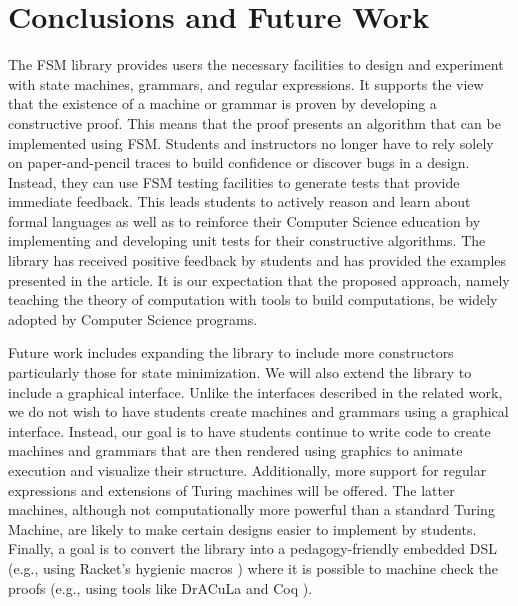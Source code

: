 \documentclass{eptcs}
\begin{document}
\section{Conclusions and Future Work}
The \textsf{FSM} library provides users the necessary facilities to design and experiment with state machines, grammars, and regular expressions. It supports the view that the existence of a machine or grammar is proven by developing a constructive proof. This means that the proof presents an algorithm that can be implemented using \textsf{FSM}. Students and instructors no longer have to rely solely on paper-and-pencil traces to build confidence or discover bugs in a design. Instead, they can use \textsf{FSM} testing facilities to generate tests that provide immediate feedback. This leads students to actively reason and learn about formal languages as well as to reinforce their Computer Science education by implementing and developing unit tests for their constructive algorithms. The library has received positive feedback by students and has provided the examples presented in the article. It is our expectation that the proposed approach, namely teaching the theory of computation with tools to build computations, be widely adopted by Computer Science programs.

Future work includes expanding the library to include more constructors particularly those for state minimization. We will also extend the library to include a graphical interface. Unlike the interfaces described in the related work, we do not wish to have students create machines and grammars using a graphical interface. Instead, our goal is to have students continue to write code to create machines and grammars that are then rendered using graphics to animate execution and visualize their structure. Additionally, more support for regular expressions and extensions of Turing machines will be offered. The latter machines, although not computationally more powerful than a standard Turing Machine, are likely to make certain designs easier to implement by students. Finally, a goal is to convert the library into a pedagogy-friendly embedded DSL (e.g., using Racket's hygienic macros \cite{AutomataMacros}) where it is possible to machine check the proofs (e.g., using tools like DrACuLa \cite{Eastlund} and Coq \cite{Coq}).




\end{document}
